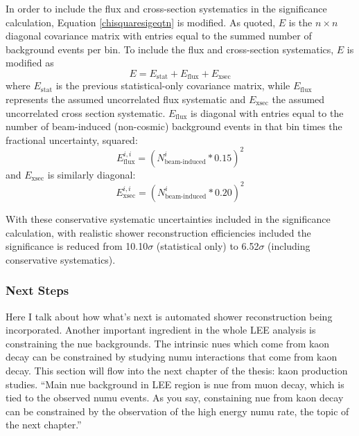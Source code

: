 In order to include the flux and cross-section systematics in the significance calculation, Equation \ref{chisquaresigeqtn} is modified. As quoted, $E$ is the $n\times n$ diagonal covariance matrix with entries equal to the summed number of background events per bin. To include the flux and cross-section systematics, $E$ is modified as
\begin{equation}\label{LEE_emtx_systematics}
E = E_{\text{stat}} + E_{\text{flux}} + E_{\text{xsec}}
\end{equation}
where $E_{\text{stat}}$ is the previous statistical-only covariance matrix, while $E_{\text{flux}}$ represents the assumed uncorrelated flux systematic and $E_{\text{xsec}}$ the assumed uncorrelated cross section systematic. $E_{\text{flux}}$ is diagonal with entries equal to the number of beam-induced (non-cosmic) background events in that bin times the fractional uncertainty, squared:
\begin{equation}\label{LEE_flux_emtx}
E_{\text{flux}}^{i,i} = (N_{\text{beam-induced}}^i*0.15)^2
\end{equation}
and $E_{\text{xsec}}$ is similarly diagonal:
\begin{equation}\label{LEE_xsec_emtx}
E_{\text{xsec}}^{i,i} = (N_{\text{beam-induced}}^i*0.20)^2
\end{equation}

With these conservative systematic uncertainties included in the significance calculation, with realistic shower reconstruction efficiencies included the significance is reduced from 10.10$\sigma$ (statistical only) to 6.52$\sigma$ (including conservative systematics).

\subsubsection{Next Steps}
Here I talk about how what's next is automated shower reconstruction being incorporated. Another important ingredient in the whole LEE analysis is constraining the nue backgrounds. The intrinsic nues which come from kaon decay can be constrained by studying numu interactions that come from kaon decay. This section will flow into the next chapter of the thesis: kaon production studies. ``Main nue background in LEE region is nue from muon decay, which is tied to the observed numu events. As you say, constaining nue from kaon decay can be constrained by the observation of the high energy numu rate, the topic of the next chapter.''


